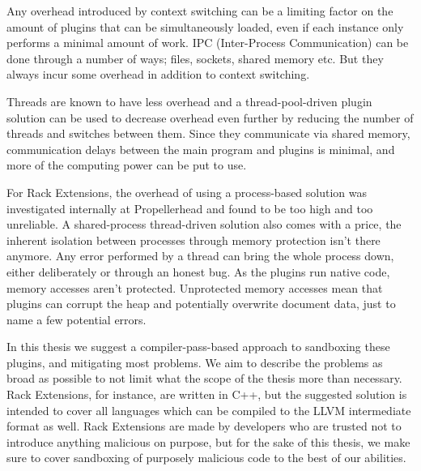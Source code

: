 Any overhead introduced by context switching can be a limiting factor on the
amount of plugins that can be simultaneously loaded, even if each instance only
performs a minimal amount of work. IPC (Inter-Process Communication) can be done
through a number of ways; files, sockets, shared memory etc. But they always
incur some overhead in addition to context switching.

Threads are known to have less overhead and a thread-pool-driven plugin
solution can be used to decrease overhead even further by reducing the number of
threads and switches between them. Since they communicate via shared memory,
communication delays between the main program and plugins is minimal, and more
of the computing power can be put to use.

For Rack Extensions, the overhead of using a process-based solution was
investigated internally at Propellerhead and found to be too high and too
unreliable. A shared-process thread-driven solution also comes with a price, the
inherent isolation between processes through memory protection isn't there
anymore. Any error performed by a thread can bring the whole process down,
either deliberately or through an honest bug. As the plugins run native code,
memory accesses aren't protected. Unprotected memory accesses mean that plugins
can corrupt the heap and potentially overwrite document data, just to name a
few potential errors.

In this thesis we suggest a compiler-pass-based approach to sandboxing these
plugins, and mitigating most problems. We aim to describe the problems as broad
as possible to not limit what the scope of the thesis more than necessary. Rack
Extensions, for instance, are written in C++, but the suggested solution is
intended to cover all languages which can be compiled to the LLVM intermediate
format as well. Rack Extensions are made by developers who are trusted not to
introduce anything malicious on purpose, but for the sake of this thesis, we
make sure to cover sandboxing of purposely malicious code to the best of our
abilities.
